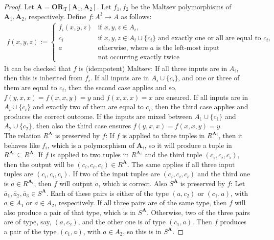 \documentclass[a4paper,english, thm-restate]{lipics-v2021}
\newcommand{\StructA}{\mathbf{A}}
\newcommand{\ORT}[1]{\mathbf{OR}_\text{T}[#1]}
\begin{document}
	\maltsevForOrConstruction*
	\begin{proof}
		Let $\StructA = \ORT{\StructA_1,\StructA_2}$.
		Let $f_1, f_2$ be the Maltsev polymorphisms of $\StructA_1, \StructA_2$, respectively.
		Define $f : A^3 \to A$ as follows: 
		\begin{align*}
			f(x,y,z) := \begin{cases}
				f_i(x,y,z) & \text{if } x,y,z \in A_i, \\
				c_{i} & \text{if } x,y,z \in A_i \cup \{c_i\} \text{ and exactly one or all are equal to } c_i,\\ 
				a& \text{otherwise, where } a \text{ is the left-most input}\\
				&\text{not occurring exactly twice}
			\end{cases}
		\end{align*}
		It can be checked that $f$ is (idempotent) Maltsev:  If all three inputs are in $A_i$, then this is inherited from $f_i$. If all inputs are in $A_i \cup \{c_i\}$, and one or three of them are equal to $c_i$, then the second case applies and so, $f(y,x,x) = f(x,x,y) = y$ and $f(x,x,x) = x$ are ensured. If all inputs are in $A_i \cup \{c_i\}$ and exactly two of them are equal to $c_i$, then the third case applies and produces the correct outcome. If the inputs are mixed between $A_1 \cup \{c_1\}$ and $A_2 \cup \{c_2\}$, then also the third case ensures $f(y,x,x) = f(x,x,y) = y$.\\
		The relation $R^{\StructA}$ is preserved by $f$: If $f$ is applied to three tuples in $R^{\StructA_i}$, then it behaves like $f_i$, which is a polymorphism of $\StructA_i$, so it will produce a tuple in $R^{\StructA_i} \subseteq R^{\StructA}$. If $f$ is applied to two tuples in $R^{\StructA_i}$ and the third tuple $(c_i,c_i,c_i)$, then the output will be $(c_i,c_i,c_i) \in R^{\StructA}$. The same applies if all three input tuples are $(c_i,c_i,c_i)$. If two of the input tuples are $(c_i,c_i,c_i)$ and the third one is $\bar{a} \in R^{\StructA_i}$, then $f$ will output $\bar{a}$, which is correct. 
		Also $S^{\StructA}$ is preserved by $f$: Let $\bar{a}_1, \bar{a}_2, \bar{a}_3 \in S^{\StructA}$. Each of these pairs is either of the type $(a,c_2)$ or $(c_1,a)$, with $a \in A_1$ or $a \in A_2$, respectively. If all three pairs are of the same type, then $f$ will also produce a pair of that type, which is in $S^{\StructA}$. Otherwise, two of the three pairs are of type, say, $(a,c_2)$, and the other one is of type $(c_1,a)$. Then $f$ produces a pair of the type $(c_1, a)$, with $a \in A_2$, so this is in $S^{\StructA}$. 
	\end{proof}	
	
\end{document}
